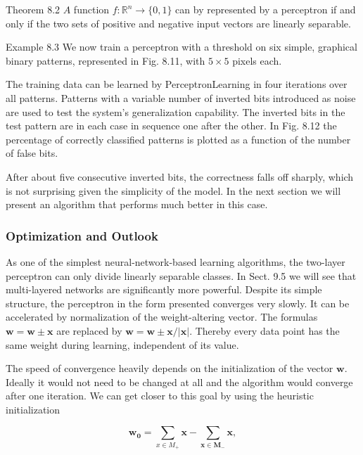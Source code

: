 \documentclass[10pt]{book}
\begin{document}
\begin{displayquote}
Theorem 8.2 $A$ function $f: \mathbb{R}^{n} \rightarrow\{0,1\}$ can by represented by a perceptron if and only if the two sets of positive and negative input vectors are linearly separable.
\end{displayquote}


Example 8.3 We now train a perceptron with a threshold on six simple, graphical binary patterns, represented in Fig. 8.11, with $5 \times 5$ pixels each.

The training data can be learned by PerceptronLearning in four iterations over all patterns. Patterns with a variable number of inverted bits introduced as noise are used to test the system's generalization capability. The inverted bits in the test pattern are in each case in sequence one after the other. In Fig. 8.12 the percentage of correctly classified patterns is plotted as a function of the number of false bits.

After about five consecutive inverted bits, the correctness falls off sharply, which is not surprising given the simplicity of the model. In the next section we will present an algorithm that performs much better in this case.

\subsubsection*{Optimization and Outlook}
As one of the simplest neural-network-based learning algorithms, the two-layer perceptron can only divide linearly separable classes. In Sect. 9.5 we will see that multi-layered networks are significantly more powerful. Despite its simple\\
structure, the perceptron in the form presented converges very slowly. It can be accelerated by normalization of the weight-altering vector. The formulas $\boldsymbol{w}=\boldsymbol{w} \pm \boldsymbol{x}$ are replaced by $\boldsymbol{w}=\boldsymbol{w} \pm \boldsymbol{x} /|\boldsymbol{x}|$. Thereby every data point has the same weight during learning, independent of its value.

The speed of convergence heavily depends on the initialization of the vector $\boldsymbol{w}$. Ideally it would not need to be changed at all and the algorithm would converge after one iteration. We can get closer to this goal by using the heuristic initialization

$$
\boldsymbol{w}_{\mathbf{0}}=\sum_{x \in M_{+}} \boldsymbol{x}-\sum_{\boldsymbol{x} \in \boldsymbol{M}_{-}} \boldsymbol{x},
$$
\end{document}
